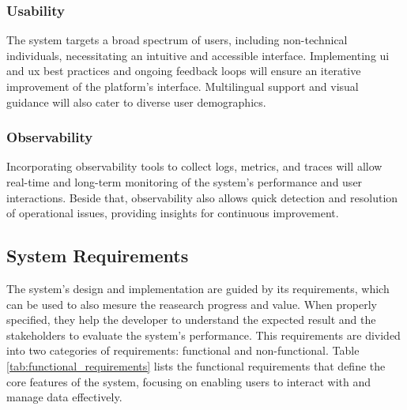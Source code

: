 \subsubsection{Usability}

The system targets a broad spectrum of users, including non-technical individuals, necessitating an intuitive and accessible interface. Implementing \ac{ui} and \ac{ux} best practices and ongoing feedback loops will ensure an iterative improvement of the platform's interface. Multilingual support and visual guidance will also cater to diverse user demographics.

\subsubsection{Observability}

Incorporating observability tools to collect logs, metrics, and traces will allow real-time and long-term monitoring of the system's performance and user interactions. Beside that, observability also allows quick detection and resolution of operational issues, providing insights for continuous improvement.


\subsection{System Requirements} \label{section:requirements}

The system's design and implementation are guided by its requirements, which can be used to also mesure the reasearch progress and value. When properly specified, they help the developer to understand the expected result and the stakeholders to evaluate the system's performance. This requirements are divided into two categories of requirements: functional and non-functional. Table \ref{tab:functional_requirements} lists the functional requirements that define the core features of the system, focusing on enabling users to interact with and manage data effectively.

